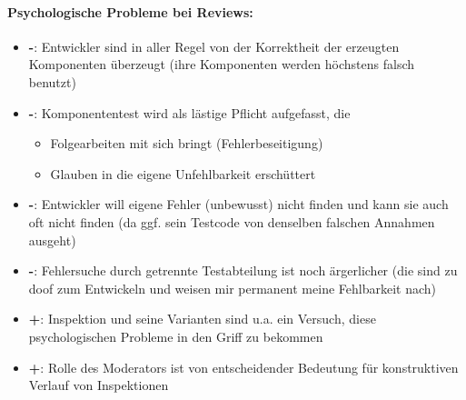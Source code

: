 \paragraph{Psychologische Probleme bei Reviews:}
\begin{itemize}
	\item \textbf{-}: Entwickler sind in aller Regel von der Korrektheit der erzeugten Komponenten überzeugt (ihre Komponenten werden höchstens falsch benutzt)
	\item \textbf{-}: Komponententest wird als lästige Pflicht aufgefasst, die
	\begin{itemize}
		\item Folgearbeiten mit sich bringt (Fehlerbeseitigung) 
		\item Glauben in die eigene Unfehlbarkeit erschüttert
	\end{itemize}
	\item \textbf{-}: Entwickler will eigene Fehler (unbewusst) nicht finden und kann sie auch oft nicht finden (da ggf. sein Testcode von denselben falschen Annahmen ausgeht)
	\item \textbf{-}: Fehlersuche durch getrennte Testabteilung ist noch ärgerlicher (die sind zu doof zum Entwickeln und weisen mir permanent meine Fehlbarkeit nach)
	\item \textbf{+}: Inspektion und seine Varianten sind u.a. ein Versuch, diese psychologischen Probleme in den Griff zu bekommen
	\item \textbf{+}: Rolle des Moderators ist von entscheidender Bedeutung für konstruktiven Verlauf von Inspektionen
\end{itemize}

